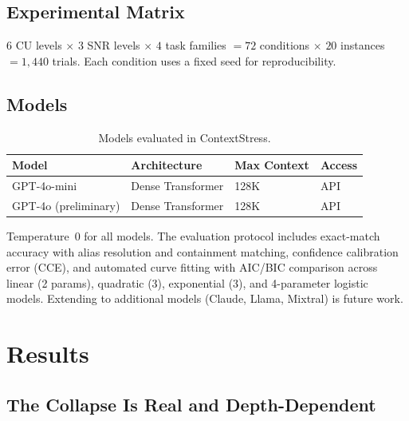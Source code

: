 \documentclass{article}
\begin{document}
\subsection{Experimental Matrix}

$6$ CU levels $\times$ $3$ SNR levels $\times$ $4$ task families $= 72$ conditions $\times$ $20$ instances $= 1{,}440$ trials. Each condition uses a fixed seed for reproducibility.

\subsection{Models}

\begin{table}[h]
\centering
\small
\caption{Models evaluated in ContextStress.}
\label{tab:models}
\begin{tabular}{@{}llll@{}}
\toprule
Model & Architecture & Max Context & Access \\
\midrule
GPT-4o-mini & Dense Transformer & 128K & API \\
GPT-4o (preliminary) & Dense Transformer & 128K & API \\
\bottomrule
\end{tabular}
\end{table}

Temperature~0 for all models. The evaluation protocol includes exact-match accuracy with alias resolution and containment matching, confidence calibration error (CCE), and automated curve fitting with AIC/BIC comparison across linear (2 params), quadratic (3), exponential (3), and 4-parameter logistic models. Extending to additional models (Claude, Llama, Mixtral) is future work.

\section{Results}
\label{sec:results}

\subsection{The Collapse Is Real and Depth-Dependent}
\end{document}
